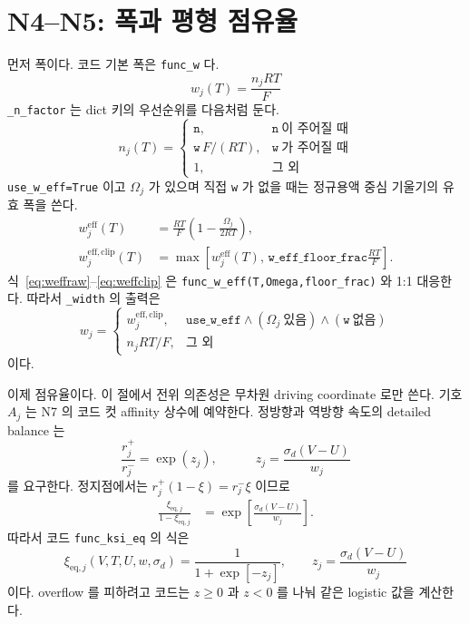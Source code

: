 \documentclass[11pt,a4paper]{article}
\newcommand{\eq}{\mathrm{eq}}
\newcommand{\eff}{\mathrm{eff}}
\begin{document}
\section{N4--N5: 폭과 평형 점유율}\label{sec:n4n5}
먼저 폭이다. 코드 기본 폭은 \texttt{func\_w} 다.
\begin{equation}
\boxed{\;w_j(T)=\frac{n_jRT}{F}\;}
\label{eq:w}
\end{equation}
\texttt{\_n\_factor} 는 dict 키의 우선순위를 다음처럼 둔다.
\begin{equation}
n_j(T)=
\begin{cases}
\texttt{n},&\texttt{n}\ \text{이 주어질 때}\\
\texttt{w}\,F/(RT),&\texttt{w}\ \text{가 주어질 때}\\
1,&\text{그 외}
\end{cases}
\label{eq:nfactor}
\end{equation}
\texttt{use\_w\_eff=True} 이고 $\Omega_j$ 가 있으며 직접 \texttt{w} 가 없을 때는 정규용액 중심 기울기의 유효 폭을 쓴다.
\begin{align}
w_j^{\eff}(T)&=\frac{RT}{F}\left(1-\frac{\Omega_j}{2RT}\right),\label{eq:weffraw}\\
w_j^{\eff,\mathrm{clip}}(T)&=\max\left[w_j^{\eff}(T),\,\texttt{w\_eff\_floor\_frac}\frac{RT}{F}\right].
\label{eq:weffclip}
\end{align}
식~\eqref{eq:weffraw}--\eqref{eq:weffclip} 은 \texttt{func\_w\_eff(T,Omega,floor\_frac)} 와 1:1 대응한다.
따라서 \texttt{\_width} 의 출력은
\begin{equation}
w_j=
\begin{cases}
w_j^{\eff,\mathrm{clip}},&
\texttt{use\_w\_eff}\land(\Omega_j\ \text{있음})\land(\texttt{w}\ \text{없음})\\
n_jRT/F,&\text{그 외}
\end{cases}
\label{eq:widthchoice}
\end{equation}
이다.

이제 점유율이다. 이 절에서 전위 의존성은 무차원 driving coordinate 로만 쓴다. 기호 $A_j$ 는 N7 의 코드 컷 affinity 상수에 예약한다. 정방향과 역방향 속도의 detailed balance 는
\begin{equation}
\frac{r_j^+}{r_j^-}=\exp(z_j),
\qquad
\quad z_j=\frac{\sigma_d(V-U)}{w_j}
\label{eq:dbv7}
\end{equation}
를 요구한다. 정지점에서는 $r_j^+(1-\xi)=r_j^-\xi$ 이므로
\begin{align}
\frac{\xi_{\eq,j}}{1-\xi_{\eq,j}}
&=\exp\!\left[\frac{\sigma_d(V-U)}{w_j}\right].
\label{eq:logit}
\end{align}
따라서 코드 \texttt{func\_ksi\_eq} 의 식은
\begin{equation}
\boxed{\;\xi_{\eq,j}(V,T,U,w,\sigma_d)=
\frac{1}{1+\exp[-z_j]},\qquad
z_j=\frac{\sigma_d(V-U)}{w_j}\;}
\label{eq:xieq}
\end{equation}
이다. overflow 를 피하려고 코드는 $z\ge0$ 과 $z<0$ 를 나눠 같은 logistic 값을 계산한다.
\end{document}
